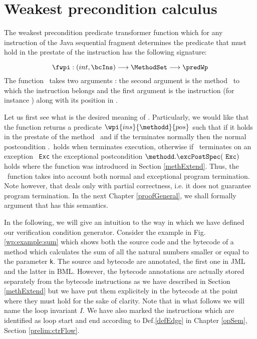  


\section{Weakest precondition calculus} \label{wpRules}


The weakest precondition predicate transformer function which for any instruction of the Java sequential fragment
determines the predicate that must hold in the prestate of the instruction has the following signature:

$$ \fwpi :   (int,\bcIns)  \longrightarrow   \MethodSet   \longrightarrow \predWp $$
The function \fwpi \ takes two arguments : 
the second argument is the method \methodd \ to which the  instruction belongs
and  the first argument is  the instruction (for instance  \putfield) along with its position in \methodd.

Let us first see what is the desired meaning of \fwpi.
Particularly, we would like that the function \fwpi{}  returns a predicate $\wpi{ins}{\methodd}{pos}$
such that  if it holds in the prestate of the method \methodd \  and if the
\methodd{} terminates normally then the normal postcondition \methodd.\normalPost \ holds when 
\methodd{} terminates execution, otherwise if \methodd \ terminates on an exception
\mbox{ \rm \texttt{Exc}} the exceptional postcondition  $\methodd.\excPostSpec(\mbox{ \rm \texttt{Exc}})$ holds where the function \excPostSpec{} was
introduced in Section \ref{methExtend}. Thus, the \fwpi \ function takes into account both normal and exceptional
program termination. Note however, that \fwpi{} deals only with partial correctness, i.e. it does not 
guarantee program termination. In the next Chapter \ref{proofGeneral}, we shall formally argument that \fwpi{} has this semantics.
 
 In the following, we will give an intuition to the way in which we have defined our verification condition generator.
 Consider the example in Fig. \ref{wp:example:sum} which 
 shows both the source code and the bytecode of a method which calculates the sum of all the natural numbers
 smaller or equal to the parameter \lstinline!k!. The source and bytecode are annotated, the first one in JML and the latter in BML.
 However, the bytecode annotations are actually stored separately from the bytecode instructions as we have described in Section \ref{methExtend}
 but we have put them explicitely in the bytecode at the point where they must hold for the sake of clarity. 
 Note that in what follows we will name the loop invariant $I$.
 We have also marked the instructions which are identified as loop start and end
 according to Def.\ref{defEdge} in Chapter \ref{opSem}, Section \ref{prelim:ctrFlow}. 

